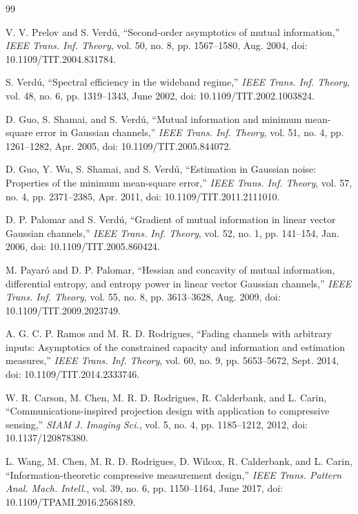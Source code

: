 \documentclass[lettersize,onecolumn]{IEEEtran}
\theoremstyle{remark}
\theoremstyle{definition}
\begin{document}
\begin{thebibliography}{99}

V. V. Prelov and S. Verd\'u, ``Second-order asymptotics of mutual information,'' \emph{IEEE Trans. Inf. Theory}, vol. 50, no. 8, pp. 1567--1580, Aug. 2004, doi: 10.1109/TIT.2004.831784.

S. Verd\'u, ``Spectral efficiency in the wideband regime,'' \emph{IEEE Trans. Inf. Theory}, vol. 48, no. 6, pp. 1319--1343, June 2002, doi: 10.1109/TIT.2002.1003824.

D. Guo, S. Shamai, and S. Verdú, ``Mutual information and minimum mean-square error in Gaussian channels,'' \emph{IEEE Trans. Inf. Theory}, vol. 51, no. 4, pp. 1261--1282, Apr. 2005, doi: 10.1109/TIT.2005.844072.

D. Guo, Y. Wu, S. Shamai, and S. Verd\'u, ``Estimation in Gaussian noise: Properties of the minimum mean-square error,'' \emph{IEEE Trans. Inf. Theory}, vol. 57, no. 4, pp. 2371--2385, Apr. 2011, doi: 10.1109/TIT.2011.2111010.

D. P. Palomar and S. Verdú, ``Gradient of mutual information in linear vector Gaussian channels,'' \emph{IEEE Trans. Inf. Theory}, vol. 52, no. 1, pp. 141--154, Jan. 2006, doi: 10.1109/TIT.2005.860424.

M. Payaró and D. P. Palomar, ``Hessian and concavity of mutual information, differential entropy, and entropy power in linear vector Gaussian channels,'' \emph{IEEE Trans. Inf. Theory}, vol. 55, no. 8, pp. 3613--3628, Aug. 2009, doi: 10.1109/TIT.2009.2023749.

A. G. C. P. Ramos and M. R. D. Rodrigues, ``Fading channels with arbitrary inputs: Asymptotics of the constrained capacity and information and estimation measures,'' \emph{IEEE Trans. Inf. Theory}, vol. 60, no. 9, pp. 5653--5672, Sept. 2014, doi: 10.1109/TIT.2014.2333746.

W. R. Carson, M. Chen, M. R. D. Rodrigues, R. Calderbank, and L. Carin, ``Communications-inspired projection design with application to compressive sensing,'' \emph{SIAM J. Imaging Sci.}, vol. 5, no. 4, pp. 1185--1212, 2012, doi: 10.1137/120878380.

L. Wang, M. Chen, M. R. D. Rodrigues, D. Wilcox, R. Calderbank, and L. Carin, ``Information-theoretic compressive measurement design,'' \emph{IEEE Trans. Pattern Anal. Mach. Intell.}, vol. 39, no. 6, pp. 1150--1164, June 2017, doi: 10.1109/TPAMI.2016.2568189.


\end{thebibliography}
\end{document}
